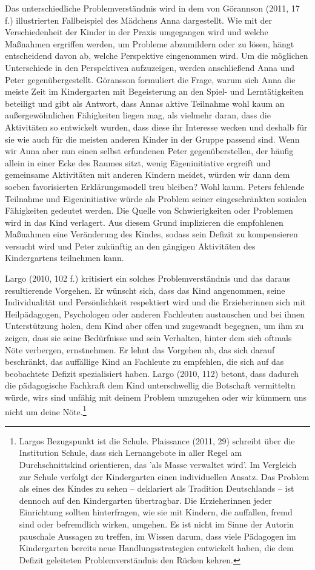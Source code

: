 Das unterschiedliche Problemverständnis wird in dem von Görannson (2011, 17 f.) illustrierten Fallbeispiel des Mädchens Anna dargestellt. Wie mit der Verschiedenheit der Kinder in der Praxis umgegangen wird und welche Maßnahmen ergriffen werden, um Probleme abzumildern oder zu lösen, hängt entscheidend davon ab, welche Perspektive eingenommen wird. Um die möglichen Unterschiede in den Perspektiven aufzuzeigen, werden anschließend Anna und Peter gegenübergestellt. 
Göransson formuliert die Frage, warum sich Anna die meiste Zeit im Kindergarten mit Begeisterung an den Spiel- und Lerntätigkeiten beteiligt und gibt als Antwort, dass Annas aktive Teilnahme wohl kaum an außergewöhnlichen Fähigkeiten liegen mag, als vielmehr daran, dass die Aktivitäten so entwickelt wurden, dass diese ihr Interesse wecken und deshalb für sie wie auch für die meisten anderen Kinder in der Gruppe passend sind. Wenn wir Anna aber nun einen selbst erfundenen Peter gegenüberstellen, der häufig allein in einer Ecke des Raumes sitzt, wenig Eigeninitiative ergreift und gemeinsame Aktivitäten mit anderen Kindern meidet, würden wir dann dem soeben favorisierten Erklärungsmodell treu bleiben? Wohl kaum. Peters fehlende Teilnahme und Eigeninitiative würde als Problem seiner eingeschränkten sozialen Fähigkeiten gedeutet werden.  Die Quelle von Schwierigkeiten oder Problemen wird in das Kind verlagert. Aus diesem Grund implizieren die empfohlenen Maßnahmen eine Veränderung des Kindes, sodass sein Defizit zu kompensieren versucht wird und Peter zukünftig an den gängigen Aktivitäten des Kindergartens teilnehmen kann. 

Largo (2010, 102 f.) kritisiert ein solches Problemverständnis und das daraus resultierende Vorgehen. Er wünscht sich, dass das Kind  angenommen, seine Individualität und Persönlichkeit respektiert wird und die Erzieherinnen sich mit Heilpädagogen, Psychologen oder anderen Fachleuten austauschen und bei ihnen Unterstützung holen, dem Kind aber offen und zugewandt begegnen, um ihm zu zeigen, dass sie seine Bedürfnisse und sein Verhalten, hinter dem sich oftmals Nöte verbergen, ernstnehmen. Er lehnt das Vorgehen ab, das sich darauf beschränkt, das auffällige Kind an Fachleute zu empfehlen, die sich auf das beobachtete Defizit spezialisiert haben. Largo (2010, 112) betont, dass dadurch die pädagogische Fachkraft dem Kind unterschwellig die Botschaft vermitteltn würde, wirs sind unfähig mit deinem Problem umzugehen oder wir kümmern uns nicht um deine Nöte.\footnote{Largos Bezugspunkt ist die Schule. Plaissance (2011, 29) schreibt über die Institution Schule, dass sich Lernangebote in aller Regel am Durchschnittskind orientieren, das 'als Masse verwaltet wird'. Im Vergleich zur Schule verfolgt der Kindergarten einen individuellen Ansatz. Das Problem als eines des Kindes zu sehen -- deklariert als Tradition Deutschlands -- ist dennoch auf den Kindergarten übertragbar. Die Erzieherinnen jeder Einrichtung sollten hinterfragen, wie sie mit Kindern, die auffallen, fremd sind oder befremdlich wirken, umgehen. Es ist nicht im Sinne der Autorin pauschale Aussagen zu treffen, im Wissen darum, dass viele Pädagogen im Kindergarten bereits neue Handlungsstrategien entwickelt haben, die dem Defizit geleiteten Problemverständnis den Rücken kehren.} 

